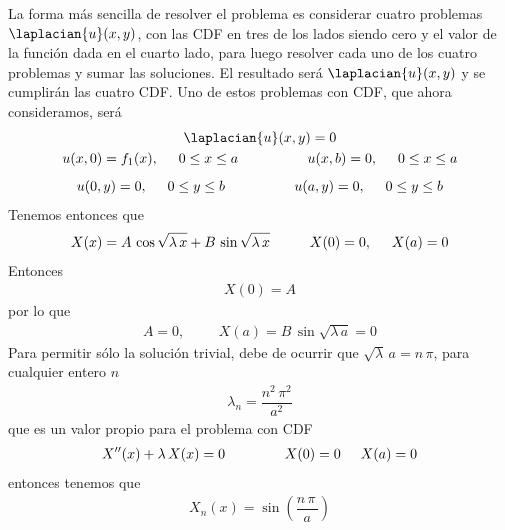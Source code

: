 La forma más sencilla de resolver el problema es considerar cuatro problemas $\laplacian{u}(x, y)$, con las CDF en tres de los lados siendo cero y el valor de la función dada en el cuarto lado, para luego resolver cada uno de los cuatro problemas y sumar las soluciones. El resultado será $\laplacian{u}(x, y)$ y se cumplirán las cuatro CDF. Uno de estos problemas con CDF, que ahora consideramos, será
\begin{align*}
\begin{gathered}
\laplacian{u}(x, y) = 0 \\
u(x, 0) = f_{1} (x), \hspace{0.5cm} 0 \leq x \leq a \hspace{1.75cm} u(x, b) = 0, \hspace{0.5cm} 0 \leq x \leq a \\[0.5em]
u(0, y) = 0, \hspace{0.5cm} 0 \leq y \leq b \hspace{1.75cm} u(a, y) = 0, \hspace{0.5cm} 0 \leq y \leq b
\end{gathered}
\end{align*}
Tenemos entonces que
\begin{align*}
X(x) = A \, \cos \sqrt{\lambda \, x} + B \, \sin \sqrt{\lambda \, x} \hspace{1cm} X(0) = 0, \hspace{0.5cm} X(a) = 0
\end{align*}
Entonces
\begin{align*}
X(0) = A
\end{align*}
por lo que
\begin{align*}
A = 0, \hspace{1cm} X(a) = B \, \sin \sqrt{\lambda \, a} = 0
\end{align*}
Para permitir sólo la solución trivial, debe de ocurrir que $\sqrt{\lambda} \, a = n \, \pi$, para cualquier entero $n$
\begin{align*}
\lambda_{n} = \dfrac{n^{2} \, \pi^{2}}{a^{2}}
\end{align*}
que es un valor propio para el problema con CDF
\begin{align*}
X^{\prime \prime} (x) + \lambda \, X(x) = 0 \hspace{1.5cm} X(0) = 0 \hspace{0.5cm} X(a) = 0
\end{align*}
entonces tenemos que
\begin{align*}
X_{n} (x) = \sin \left( \dfrac{n \, \pi \, }{a} \right)
\end{align*}
